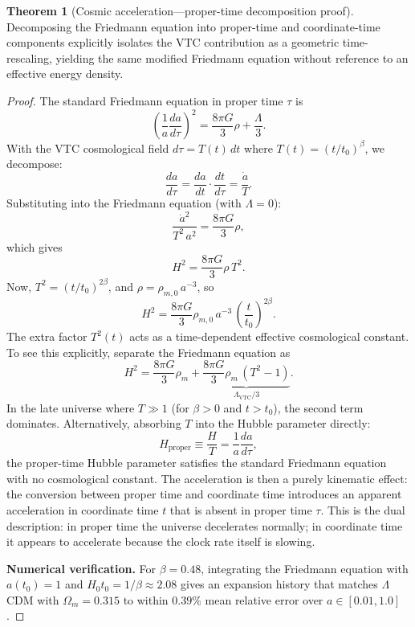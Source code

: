 \documentclass[11pt,a4paper]{article}
\theoremstyle{definition}
\newtheorem{theorem}{Theorem}[section]
\newcommand{\VTC}{\mathrm{VTC}}
\begin{document}
\begin{theorem}[Cosmic acceleration---proper-time decomposition proof]
Decomposing the Friedmann equation into proper-time and coordinate-time components explicitly isolates the VTC contribution as a geometric time-rescaling, yielding the same modified Friedmann equation without reference to an effective energy density.
\end{theorem}

\begin{proof}
The standard Friedmann equation in proper time $\tau$ is
\begin{equation}
\left(\frac{1}{a}\frac{da}{d\tau}\right)^2 = \frac{8\pi G}{3}\rho + \frac{\Lambda}{3}.
\end{equation}
With the VTC cosmological field $d\tau = T(t)\,dt$ where $T(t) = (t/t_0)^\beta$, we decompose:
\begin{equation}
\frac{da}{d\tau} = \frac{da}{dt}\cdot\frac{dt}{d\tau} = \frac{\dot{a}}{T}.
\end{equation}
Substituting into the Friedmann equation (with $\Lambda = 0$):
\begin{equation}
\frac{\dot{a}^2}{T^2\,a^2} = \frac{8\pi G}{3}\rho,
\end{equation}
which gives
\begin{equation}
H^2 = \frac{8\pi G}{3}\rho\,T^2.
\end{equation}
Now, $T^2 = (t/t_0)^{2\beta}$, and $\rho = \rho_{m,0}\,a^{-3}$, so
\begin{equation}
H^2 = \frac{8\pi G}{3}\rho_{m,0}\,a^{-3}\,\left(\frac{t}{t_0}\right)^{2\beta}.
\end{equation}
The extra factor $T^2(t)$ acts as a time-dependent effective cosmological constant. To see this explicitly, separate the Friedmann equation as
\begin{equation}
H^2 = \frac{8\pi G}{3}\rho_m + \underbrace{\frac{8\pi G}{3}\rho_m\,(T^2 - 1)}_{\displaystyle\Lambda_{\VTC}/3}.
\end{equation}
In the late universe where $T \gg 1$ (for $\beta > 0$ and $t > t_0$), the second term dominates. Alternatively, absorbing $T$ into the Hubble parameter directly:
\begin{equation}
H_{\mathrm{proper}} \equiv \frac{H}{T} = \frac{1}{a}\frac{da}{d\tau},
\end{equation}
the proper-time Hubble parameter satisfies the standard Friedmann equation with no cosmological constant. The acceleration is then a purely kinematic effect: the conversion between proper time and coordinate time introduces an apparent acceleration in coordinate time $t$ that is absent in proper time $\tau$. This is the dual description: in proper time the universe decelerates normally; in coordinate time it appears to accelerate because the clock rate itself is slowing.

\textbf{Numerical verification.} For $\beta = 0.48$, integrating the Friedmann equation with $a(t_0) = 1$ and $H_0 t_0 = 1/\beta \approx 2.08$ gives an expansion history that matches $\Lambda$CDM with $\Omega_m = 0.315$ to within $0.39\%$ mean relative error over $a \in [0.01, 1.0]$.
\end{proof}
\end{document}
